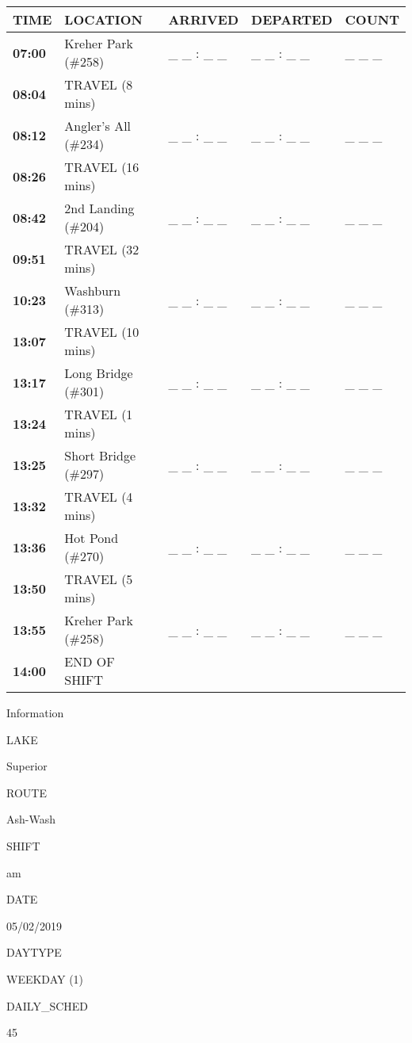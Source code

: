 \documentclass[]{article}
\begin{document}
\begin{tabular}{>{\bfseries}lllll}
\toprule
\textbf{TIME} & \textbf{LOCATION} & \textbf{ARRIVED} & \textbf{DEPARTED} & \textbf{COUNT}\\
\midrule
07:00 & Kreher Park (\#258) & \_ \_ : \_ \_ & \_ \_ : \_ \_ & \_ \_ \_\\
08:04 & TRAVEL (8 mins) &  &  & \\
08:12 & Angler's All (\#234) & \_ \_ : \_ \_ & \_ \_ : \_ \_ & \_ \_ \_\\
08:26 & TRAVEL (16 mins) &  &  & \\
08:42 & 2nd Landing (\#204) & \_ \_ : \_ \_ & \_ \_ : \_ \_ & \_ \_ \_\\
09:51 & TRAVEL (32 mins) &  &  & \\
10:23 & Washburn (\#313) & \_ \_ : \_ \_ & \_ \_ : \_ \_ & \_ \_ \_\\
13:07 & TRAVEL (10 mins) &  &  & \\
13:17 & Long Bridge (\#301) & \_ \_ : \_ \_ & \_ \_ : \_ \_ & \_ \_ \_\\
13:24 & TRAVEL (1 mins) &  &  & \\
13:25 & Short Bridge (\#297) & \_ \_ : \_ \_ & \_ \_ : \_ \_ & \_ \_ \_\\
13:32 & TRAVEL (4 mins) &  &  & \\
13:36 & Hot Pond (\#270) & \_ \_ : \_ \_ & \_ \_ : \_ \_ & \_ \_ \_\\
13:50 & TRAVEL (5 mins) &  &  & \\
13:55 & Kreher Park (\#258) & \_ \_ : \_ \_ & \_ \_ : \_ \_ & \_ \_ \_\\
14:00 & END OF SHIFT &  &  & \\
\bottomrule
\end{tabular}\newpage

Information

LAKE

Superior

ROUTE

Ash-Wash

SHIFT

am

DATE

05/02/2019

DAYTYPE

WEEKDAY (1)

DAILY\_SCHED

45

\vspace{24pt}
\end{document}
